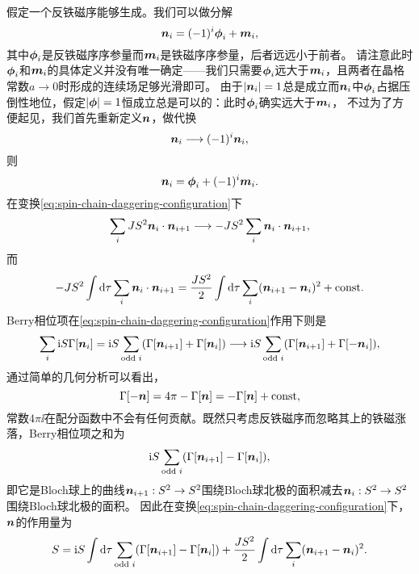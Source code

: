 假定一个反铁磁序能够生成。我们可以做分解
\begin{equation}
    \vb*{n}_i = (-1)^i \vb*{\phi}_i + \vb*{m}_i,
\end{equation}
其中$\vb*{\phi}_i$是反铁磁序序参量而$\vb*{m}_i$是铁磁序序参量，后者远远小于前者。
请注意此时$\vb*{\phi}_i$和$\vb*{m}_i$的具体定义并没有唯一确定——我们只需要$\vb*{\phi}_i$远大于$\vb*{m}_i$，且两者在晶格常数$a \to 0$时形成的连续场足够光滑即可。
由于$\abs{\vb*{n}_i} = 1$总是成立而$\vb*{n}_i$中$\vb*{\phi}_i$占据压倒性地位，假定$\abs{\vb*{\phi}} = 1$恒成立总是可以的：此时$\vb*{\phi}_i$确实远大于$\vb*{m}_i$，
不过为了方便起见，我们首先重新定义$\vb*{n}$，做代换
\begin{equation}
    \vb*{n}_i \longrightarrow (-1)^i \vb*{n}_i,
    \label{eq:spin-chain-daggering-configuration}
\end{equation}
则
\begin{equation}
    \vb*{n}_i = \vb*{\phi}_i + (-1)^i \vb*{m}_i.
    \label{eq:spin-chain-afm-decomposition-after-staggering}
\end{equation}
在变换\eqref{eq:spin-chain-daggering-configuration}下
\[
    \sum_i JS^2 \vb*{n}_i \cdot \vb*{n}_{i+1} \longrightarrow - JS^2 \sum_i \vb*{n}_i \cdot \vb*{n}_{i+1},
\]
而
\[
    - JS^2 \int \dd{\tau} \sum_i \vb*{n}_i \cdot \vb*{n}_{i+1} = \frac{JS^2}{2} \int \dd{\tau} \sum_i (\vb*{n}_{i+1} - \vb*{n}_i)^2 + \mathrm{const}.
\]
Berry相位项在\eqref{eq:spin-chain-daggering-configuration}作用下则是
\[
    \sum_i \mathrm{i} S \Gamma[\vb*{n}_i] = \mathrm{i} S \sum_{\text{odd $i$}} (\Gamma[\vb*{n}_{i+1}] + \Gamma[\vb*{n}_i]) \longrightarrow \mathrm{i} S \sum_{\text{odd $i$}} (\Gamma[\vb*{n}_{i+1}] + \Gamma[-\vb*{n}_i]) ,
\]
通过简单的几何分析可以看出，
\begin{equation}
    \Gamma[-\vb*{n}] = 4 \pi - \Gamma[\vb*{n}] = - \Gamma[\vb*{n}] + \mathrm{const},
\end{equation}
常数$4 \pi \ii$在配分函数中不会有任何贡献。既然只考虑反铁磁序而忽略其上的铁磁涨落，Berry相位项之和为
\[
    \mathrm{i} S \sum_\text{odd $i$} (\Gamma[\vb*{n}_{i+1}] - \Gamma[\vb*{n}_i]),
\]
即它是Bloch球上的曲线$\vb*{n}_{i+1}: S^2 \to S^2$围绕Bloch球北极的面积减去$\vb*{n}_i : S^2 \to S^2$围绕Bloch球北极的面积。
因此在变换\eqref{eq:spin-chain-daggering-configuration}下，$\vb*{n}$的作用量为
\begin{equation}
    S = \mathrm{i} S \int \dd{\tau} \sum_\text{odd $i$} (\Gamma[\vb*{n}_{i+1}] - \Gamma[\vb*{n}_i]) + \frac{JS^2}{2} \int \dd{\tau} \sum_i (\vb*{n}_{i+1} - \vb*{n}_i)^2.
    \label{eq:discrete-heisenberg-spin-chain-action}
\end{equation}


